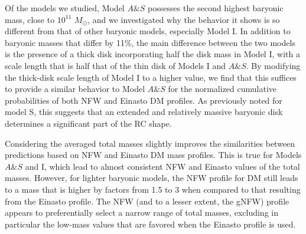 \documentclass{aa}
\begin{document}
 Of the models we studied, Model $A\&S$ possesses the second highest baryonic mass, close to $10^{11}$ $M_{\odot}$, and we investigated why the behavior it shows is so different from that of other baryonic models, especially Model I. In addition to baryonic masses that differ by 11\%, the main difference between the two models is the presence of a thick disk incorporating half the disk mass in Model I, with a scale length that is half that of the thin disk of Models I and $A\&S$. By modifying the thick-disk scale length of Model I to a higher value, we find that this suffices to provide a similar behavior to Model $A\&S$ for the normalized cumulative probabilities of both NFW and Einasto DM profiles. As previously noted for model S, this suggests that an extended and relatively massive baryonic disk determines a significant part of the RC shape.

 Considering the averaged total masses slightly improves the similarities between predictions based on NFW and Einasto DM mass profiles. This is true for Models $A\&S$ and I, which lead to almost consistent NFW and Einasto values of the total masses. However, for lighter baryonic models, the NFW profile for DM still leads to a mass that is higher by factors from 1.5 to 3 when compared to that resulting from the Einasto profile. The NFW (and to a lesser extent, the gNFW) profile appears to preferentially select a narrow range of total masses, excluding in particular the low-mass values that are favored when the Einasto profile is used.
\end{document}
